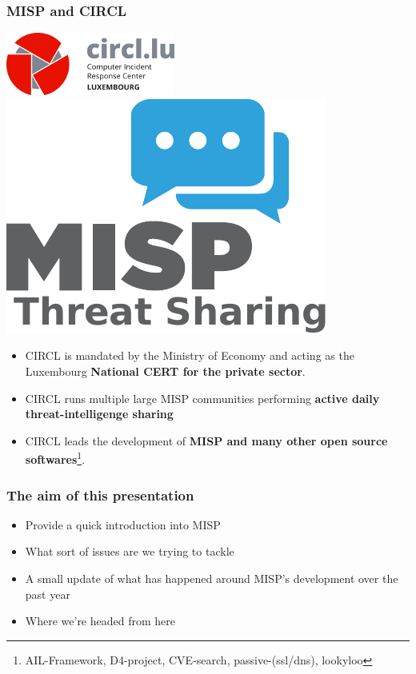 
\begin{frame}
\titlepage
\end{frame}

\begin{frame}
  \frametitle{MISP and CIRCL}
  \begin{center}
    \includegraphics[scale=0.45]{circl.png}
    \hspace{2.5em}
    \includegraphics[scale=0.35]{misp.pdf}
  \end{center}
  \begin{itemize}
    \item CIRCL is mandated by the Ministry of Economy and acting as the Luxembourg {\bf National CERT for the private sector}. 
    \item CIRCL runs multiple large MISP communities performing {\bf active daily threat-intelligenge sharing}
    \item CIRCL leads the development of {\bf MISP and many other open source softwares}\footnote{AIL-Framework, D4-project, CVE-search, passive-(ssl/dns), lookyloo}.
  \end{itemize}
\end{frame}


\begin{frame}
  \frametitle{The aim of this presentation}
  \begin{itemize}
     \item Provide a quick introduction into MISP
     \item What sort of issues are we trying to tackle
     \item A small update of what has happened around MISP's development over the past year
     \item Where we're headed from here
  \end{itemize}
\end{frame}

